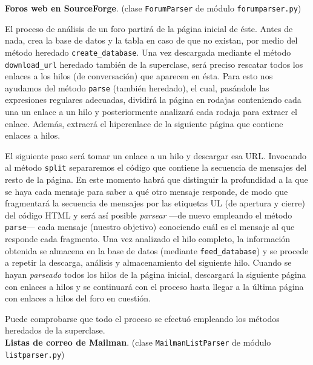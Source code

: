 \noindent \textbf{Foros web en SourceForge}. (clase \texttt{ForumParser}
de módulo \texttt{forumparser.py})

El proceso de análisis de un foro partirá de la página inicial de éste.
Antes de nada, crea la base de datos y la tabla en caso de que no existan, por medio
del método heredado \texttt{create\_\-database}. Una vez
descargada mediante el método \texttt{download\_url} heredado también de la superclase,
será preciso rescatar todos los enlaces a los hilos (de conversación) que aparecen en ésta.
Para esto nos ayudamos del método \texttt{parse} (también heredado), el cual, pasándole
las expresiones regulares adecuadas, dividirá la página en rodajas conteniendo
cada una un enlace a un hilo y posteriormente analizará cada rodaja para extraer
el enlace. Además, extraerá el hiperenlace de la siguiente página que contiene
enlaces a hilos.

El siguiente paso será tomar un enlace a un hilo y descargar esa URL.
Invocando al método \texttt{split} separaremos el código que contiene la secuencia
de mensajes del resto de la página. En este momento habrá que distinguir la profundidad
a la que se haya cada mensaje para saber a qué otro mensaje responde,
de modo que fragmentará la secuencia de mensajes por las etiquetas UL (de apertura
y cierre) del código
HTML y será así posible \textit{parsear} ---de nuevo empleando el método \texttt{parse}---
cada mensaje (nuestro objetivo) conociendo cuál es
el mensaje al que responde cada fragmento.
Una vez analizado el hilo completo, la información obtenida se almacena en la
base de datos (mediante \texttt{feed\_database}) y se procede a repetir la
descarga, análisis y almacenamiento
del siguiente hilo. Cuando se hayan \textit{parseado} todos los hilos de la
página inicial, descargará la siguiente página con enlaces a hilos y se continuará
con el proceso hasta llegar a la última página con enlaces a hilos del foro en
cuestión.

Puede comprobarse que todo el proceso se efectuó empleando los métodos heredados de
la superclase.\\

\noindent \textbf{Listas de correo de Mailman}. (clase \texttt{MailmanListParser}
de módulo \texttt{listparser.py})

